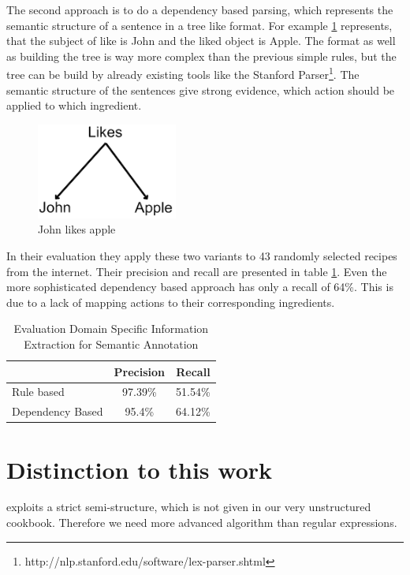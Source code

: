 \documentclass[12pt, twoside]{report}
\begin{document}
The second approach is to do a dependency based parsing, which represents the semantic structure of a sentence in a tree like format. For example \cref{fig:johnLikesApple} represents, that the subject of like is John and the liked object is Apple.
The format as well as building the tree is way more complex than the previous simple rules, but the tree can be build by already existing tools like the Stanford Parser\footnote{http://nlp.stanford.edu/software/lex-parser.shtml}. The semantic structure of the sentences give strong evidence, which action should be applied to which ingredient.

\begin{figure}[H]
	\centering
	\includegraphics[]{Images/JohnLikesApple}
	\caption{John likes apple \parencite{GrammaBased}}
	\label{fig:johnLikesApple}
\end{figure}

In their evaluation they apply these two variants to 43 randomly selected recipes from the internet. Their precision and recall are presented in table \ref{tab:masterEval}. Even the more sophisticated dependency based approach has only a recall of 64\%. This is due to a lack of mapping actions to their corresponding ingredients.

\begin{table}[H]
	\centering
	\begin{tabular}{ l | c | r } 
		& Precision & Recall \\
		\hline
		Rule based & 97.39\% & 51.54\% \\
		Dependency Based & 95.4\% & 64.12\% \\
	\end{tabular}
	\caption{Evaluation Domain Specific Information Extraction for Semantic Annotation}
	\label{tab:masterEval}
\end{table}

\section{Distinction to this work}
\parencite{REgutGenug} exploits a strict semi-structure, which is not given in our very unstructured cookbook. Therefore we need more advanced algorithm than regular expressions.
\end{document}
